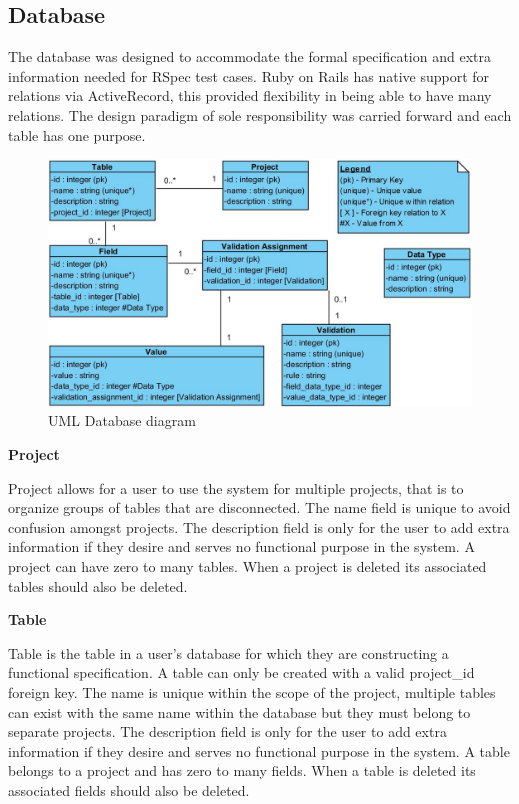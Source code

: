 \documentclass[a4paper,12pt]{article}
\begin{document}
\subsection{Database}
\par The database was designed to accommodate the formal specification and extra information needed for RSpec test cases. Ruby on Rails has native support for relations via ActiveRecord, this provided flexibility in being able to have many relations. The design paradigm of sole responsibility was carried forward and each table has one purpose.
\vspace{3mm}
\begin{figure}
\includegraphics[width=\linewidth]{screenshots/databaseUML}
\caption{UML Database diagram}
\label{fig:UML1}
\end{figure}
\vspace{3mm}
\par \textbf{Project}
\par Project allows for a user to use the system for multiple projects, that is to organize groups of tables that are disconnected. The name field is unique to avoid confusion amongst projects. The description field is only for the user to add extra information if they desire and serves no functional purpose in the system. A project can have zero to many tables. When a project  is deleted its associated tables should also be deleted.
\vspace{3mm}
\par \textbf{Table}
\par Table is the table in a user's database for which they are constructing a functional specification. A table can only be created with a valid project\_id foreign key. The name is unique within the scope of the project, multiple tables can exist with the same name within the database but they must belong to separate projects. The description field is only for the user to add extra information if they desire and serves no functional purpose in the system. A table belongs to a project and has zero to many fields. When a table is deleted its associated fields should also be deleted.
\end{document}
